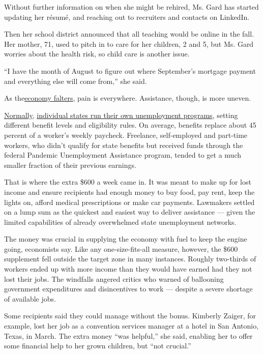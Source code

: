 Without further information on when she might be rehired, Ms. Gard has
started updating her résumé, and reaching out to recruiters and contacts
on LinkedIn.

Then her school district announced that all teaching would be online in
the fall. Her mother, 71, used to pitch in to care for her children, 2
and 5, but Ms. Gard worries about the health risk, so child care is
another issue.

``I have the month of August to figure out where September's mortgage
payment and everything else will come from,'' she said.

As
the\href{https://www.nytimes.com/2020/07/23/business/economy/unemployment-economy-coronavirus.html}{economy
falters}, pain is everywhere. Assistance, though, is more uneven.

\href{https://www.cbpp.org/research/economy/policy-basics-unemployment-insurance}{Normally},
\href{https://www.cbpp.org/research/economy/policy-basics-how-many-weeks-of-unemployment-compensation-are-available}{individual
states run their own unemployment programs}, setting different benefit
levels and eligibility rules. On average, benefits replace about 45
percent of a worker's weekly paycheck. Freelance, self-employed and
part-time workers, who didn't qualify for state benefits but received
funds through the federal Pandemic Unemployment Assistance program,
tended to get a much smaller fraction of their previous earnings.

That is where the extra \$600 a week came in. It was meant to make up
for lost income and ensure recipients had enough money to buy food, pay
rent, keep the lights on, afford medical prescriptions or make car
payments. Lawmakers settled on a lump sum as the quickest and easiest
way to deliver assistance --- given the limited capabilities of already
overwhelmed state unemployment networks.

The money was crucial in supplying the economy with fuel to keep the
engine going, economists say. Like any one-size-fits-all measure,
however, the \$600 supplement fell outside the target zone in many
instances. Roughly two-thirds of workers ended up with more income than
they would have earned had they not lost their jobs. The windfalls
angered critics who warned of ballooning government expenditures and
disincentives to work --- despite a severe shortage of available jobs.

Some recipients said they could manage without the bonus. Kimberly
Zaiger, for example, lost her job as a convention services manager at a
hotel in San Antonio, Texas, in March. The extra money ``was helpful,''
she said, enabling her to offer some financial help to her grown
children, but ``not crucial.''

